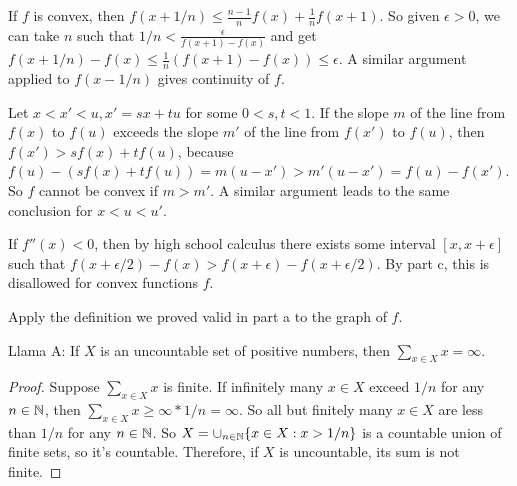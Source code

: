 \documentclass[11pt, oneside]{article}   	%
\begin{document}
\item If $f$ is convex, then $f(x + 1/n) \le \frac{n-1}{n}f(x) + \frac{1}{n}f(x+1)$. So given $\epsilon > 0$, we can take $n$ such that $1/n < \frac{\epsilon}{f(x+1) - f(x)}$ and get $f(x + 1/n) - f(x) \le \frac{1}{n}(f(x+1) - f(x)) \le \epsilon$. A similar argument applied to $f(x - 1/n)$ gives continuity of $f$.
\item Let $x < x' < u, x' = sx + tu$ for some $0 < s, t < 1$. If the slope $m$ of the line from $f(x)$ to $f(u)$ exceeds the slope $m'$ of the line from $f(x')$ to $f(u)$, then $f(x') > sf(x) + tf(u)$, because $f(u) - (sf(x) + tf(u)) = m(u-x') > m'(u - x') = f(u) - f(x')$. So $f$ cannot be convex if $m > m'$. A similar argument leads to the same conclusion for $x < u < u'$.
\item If $f''(x) < 0$, then by high school calculus there exists some interval $[x,x+\epsilon]$ such that $f(x + \epsilon / 2) - f(x) > f(x + \epsilon) - f(x + \epsilon / 2)$. By part c, this is disallowed for convex functions $f$.
\item Apply the definition we proved valid in part a to the graph of $f$. 
\ee
\item \be
\item Llama A: If $X$ is an uncountable set of positive numbers, then $\sum_{x \in X} x = \infty$.
\begin{proof}
Suppose $\sum_{x \in X} x$ is finite. If infinitely many $x \in X$ exceed $1/n$ for any $n \in \mathbb{N}$, then $\sum_{x \in X} x \ge \infty * 1/n = \infty$. So all but finitely many $x \in X$ are less than $1/n$ for any $n \in \mathbb{N}$. So $X = \cup_{n \in \mathbb{N}}\{x \in X: x > 1/n\}$ is a countable union of finite sets, so it's countable. Therefore, if $X$ is uncountable, its sum is not finite.
\end{proof}
\end{document}
